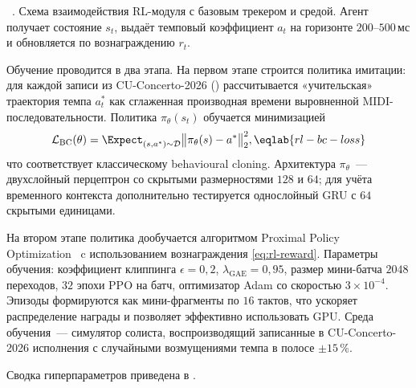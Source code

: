 \par\addvspace{2pt}
{\centering
{}%
\resizebox{\columnwidth}{!}{}\par
\vspace{2pt}
\footnotesize
\figurename~\thefigure. Схема взаимодействия RL-модуля с базовым
трекером и средой. Агент получает состояние $s_t$, выдаёт темповый
коэффициент $a_t$ на горизонте $200$--$500$\,мс и обновляется по
вознаграждению $r_t$.\par}
\addvspace{4pt}

Обучение проводится в два этапа. На первом этапе строится политика
имитации: для каждой записи из CU-Concerto-2026 ()
рассчитывается «учительская» траектория темпа $a^*_t$ как
сглаженная производная времени выровненной MIDI-последовательности.
Политика $\pi_\theta(s_t)$ обучается минимизацией
\begin{equation}
\mathcal{L}_{\text{BC}}(\theta) =
\Expect_{(s,a^*)\sim\mathcal{D}}
\bigl\|\pi_\theta(s) - a^*\bigr\|_2^2,
\eqlab{rl-bc-loss}
\end{equation}
что соответствует классическому behavioural cloning. Архитектура
$\pi_\theta$~--- двухслойный перцептрон со скрытыми размерностями
$128$ и $64$; для учёта временного контекста дополнительно
тестируется однослойный GRU с $64$ скрытыми единицами.

На втором этапе политика дообучается алгоритмом Proximal Policy
Optimization~\cite{Schulman2017PPO} c использованием вознаграждения
\eqref{eq:rl-reward}. Параметры обучения: коэффициент клиппинга
$\epsilon=0{,}2$, $\lambda_{\text{GAE}}=0{,}95$, размер мини-батча
$2048$ переходов, $32$ эпохи PPO на батч, оптимизатор Adam со
скоростью $3\!\times\!10^{-4}$. Эпизоды формируются как мини-фрагменты
по $16$ тактов, что ускоряет распределение награды и позволяет
эффективно использовать GPU. Среда обучения~--- симулятор солиста,
воспроизводящий записанные в CU-Concerto-2026 исполнения с случайными
возмущениями темпа в полосе $\pm 15$\,\%.

Сводка гиперпараметров приведена в .

